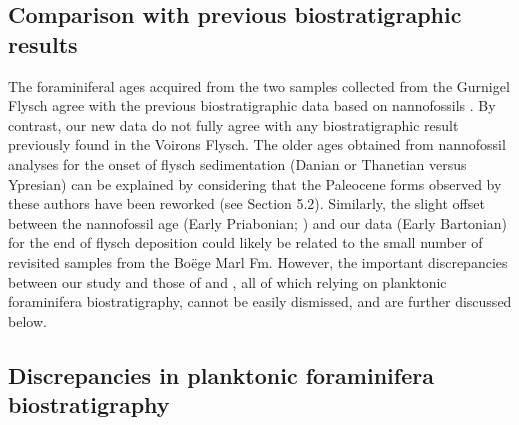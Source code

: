 \documentclass[twoside]{article}
\begin{document}
\subsection{Comparison with previous biostratigraphic results}

The foraminiferal ages acquired from the two samples collected from the Gurnigel Flysch agree with the previous biostratigraphic data based on nannofossils \citep{Weidmann1976a,Morel1980b}. By contrast, our new data do not fully agree with any biostratigraphic result previously found in the Voirons Flysch. The older ages obtained from nannofossil analyses \citep{JanduChene1975c,Stuijvenberg1980b} for the onset of flysch sedimentation (Danian or Thanetian versus Ypresian) can be explained by considering that the Paleocene forms observed by these authors have been reworked (see Section 5.2). Similarly, the slight offset between the nannofossil age (Early Priabonian; \citealp{Stuijvenberg1980b}) and our data (Early Bartonian) for the end of flysch deposition could likely be related to the small number of revisited samples from the Boëge Marl Fm. However, the important discrepancies between our study and those of \citep{Ospina-Ostios2013} and \citep{Ospina-Ostios2017}, all of which relying on planktonic foraminifera biostratigraphy, cannot be easily dismissed, and are further discussed below.\par

\subsection{Discrepancies in planktonic foraminifera biostratigraphy}
\end{document}
